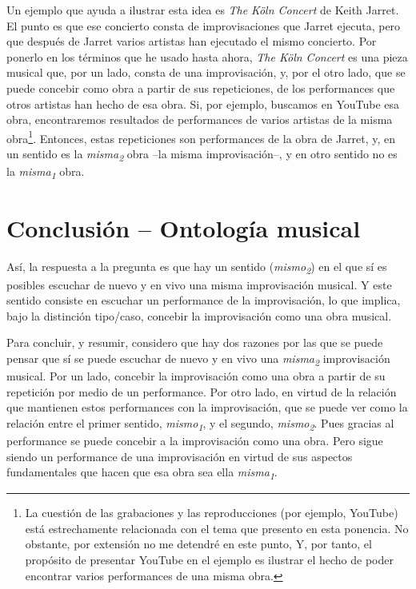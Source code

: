 \documentclass[]{book}
\begin{document}
Un ejemplo que ayuda a ilustrar esta idea es \emph{The} \emph{Köln
Concert} de Keith Jarret. El punto es que ese concierto consta de
improvisaciones que Jarret ejecuta, pero que después de Jarret varios
artistas han ejecutado el mismo concierto. Por ponerlo en los términos
que he usado hasta ahora, \emph{The Köln Concert} es una pieza musical
que, por un lado, consta de una improvisación, y, por el otro lado, que
se puede concebir como obra a partir de sus repeticiones, de los
performances que otros artistas han hecho de esa obra. Si, por ejemplo,
buscamos en YouTube esa obra, encontraremos resultados de performances
de varios artistas de la misma obra\footnote{La cuestión de las
  grabaciones y las reproducciones (por ejemplo, YouTube) está
  estrechamente relacionada con el tema que presento en esta ponencia.
  No obstante, por extensión no me detendré en este punto, Y, por tanto,
  el propósito de presentar YouTube en el ejemplo es ilustrar el hecho
  de poder encontrar varios performances de una misma obra.}. Entonces,
estas repeticiones son performances de la obra de Jarret, y, en un
sentido es la \emph{misma\textsubscript{2}} obra --la misma
improvisación--, y en otro sentido no es la
\emph{misma\textsubscript{1}} obra.

\section*{Conclusión -- Ontología musical}

Así, la respuesta a la pregunta es que hay un sentido
(\emph{mismo\textsubscript{2}}) en el que sí es posibles escuchar de
nuevo y en vivo una misma improvisación musical. Y este sentido consiste
en escuchar un performance de la improvisación, lo que implica, bajo la
distinción tipo/caso, concebir la improvisación como una obra musical.

Para concluir, y resumir, considero que hay dos razones por las que se
puede pensar que sí se puede escuchar de nuevo y en vivo una
\emph{misma\textsubscript{2 }}improvisación musical. Por un lado,
concebir la improvisación como una obra a partir de su repetición por
medio de un performance. Por otro lado, en virtud de la relación que
mantienen estos performances con la improvisación, que se puede ver como
la relación entre el primer sentido, \emph{mismo\textsubscript{1}}, y el
segundo, \emph{mismo\textsubscript{2}}. Pues gracias al performance se
puede concebir a la improvisación como una obra. Pero sigue siendo un
performance de una improvisación en virtud de sus aspectos fundamentales
que hacen que esa obra sea ella \emph{misma\textsubscript{1}}.
\end{document}
